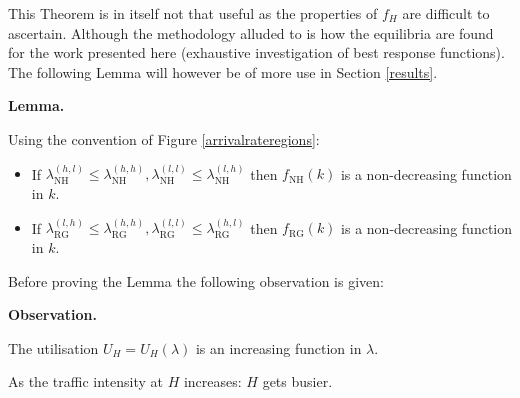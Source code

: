 \documentclass{article}
\newcommand{\NH}{\text{NH}}
\newcommand{\RG}{\text{RG}}
\begin{document}
This Theorem is in itself not that useful as the properties of $f_{H}$ are difficult to ascertain.
Although the methodology alluded to is how the equilibria are found for the work presented here (exhaustive investigation of best response functions).
The following Lemma will however be of more use in Section \ref{results}.

\textbf{Lemma.}

Using the convention of Figure \ref{arrivalrateregions}:

\begin{itemize}

\item If $\lambda_{\NH}^{(h,l)}\leq \lambda_{\NH}^{(h,h)},\lambda_{\NH}^{(l,l)}\leq \lambda_{\NH}^{(l,h)}$ then $f_{\NH}(k)$ is a non-decreasing function in $k$.
\item If $\lambda_{\RG}^{(l,h)}\leq \lambda_{\RG}^{(h,h)},\lambda_{\RG}^{(l,l)}\leq \lambda_{\RG}^{(h,l)}$ then $f_{\RG}(k)$ is a non-decreasing function in $k$.

\end{itemize}

Before proving the Lemma the following observation is given:

\textbf{Observation.}

The utilisation $U_H=U_H(\lambda)$ is an increasing function in $\lambda$.

\begin{center}
As the traffic intensity at $H$ increases: $H$ gets busier.
\end{center}
\end{document}
